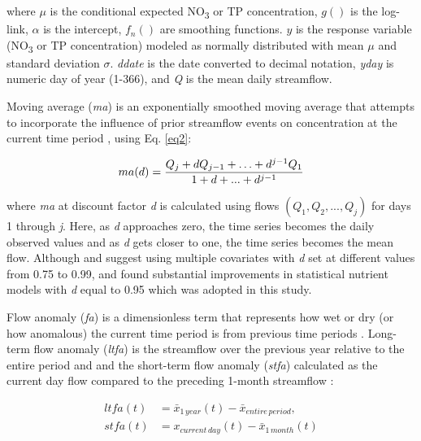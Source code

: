 \documentclass[fleqn,10pt,lineno]{wlpeerj} %
\begin{document}
where \(\mu\) is the conditional expected NO\textsubscript{3} or TP
concentration, \(g()\) is the log-link, \(\alpha\) is the intercept,
\(f_n()\) are smoothing functions. \(y\) is the response variable
(NO\textsubscript{3} or TP concentration) modeled as normally
distributed with mean \(\mu\) and standard deviation \(\sigma\).
\emph{ddate} is the date converted to decimal notation, \emph{yday} is
numeric day of year (1-366), and \emph{Q} is the mean daily streamflow.

Moving average (\emph{ma}) is an exponentially smoothed moving average
that attempts to incorporate the influence of prior streamflow events on
concentration at the current time period
\autocite{wangLoadEstimationUncertainties2011,kuhnertQuantifyingTotalSuspended2012,wangSedimentConcentrationPrediction2013a,zhang_improving_2017},
using Eq. \ref{eq2}:

\begin{equation}
ma(d) = \frac{Q_j + dQ_{j-1} + \mathellipsis + d^{j-1}Q_1}{1+d+...+d^{j-1}}
\label{eq2}
\end{equation}

where \emph{ma} at discount factor \emph{d} is calculated using flows
\((Q_1,Q_2,...,Q_j)\) for days 1 through \emph{j}. Here, as \emph{d}
approaches zero, the time series becomes the daily observed values and
as \emph{d} gets closer to one, the time series becomes the mean flow.
Although \textcite{kuhnertQuantifyingTotalSuspended2012} and
\textcite{wangSedimentConcentrationPrediction2013a} suggest using
multiple covariates with \emph{d} set at different values from 0.75 to
0.99, \textcite{robson_prediction_2015-1} and
\textcite{zhang_improving_2017} found substantial improvements in
statistical nutrient models with \emph{d} equal to 0.95 which was
adopted in this study.

Flow anomaly (\emph{fa}) is a dimensionless term that represents how wet
or dry (or how anomalous) the current time period is from previous time
periods
\autocite{vecchiaTrendsConcentrationsUse2009,zhang_improving_2017}.
Long-term flow anomaly (\emph{ltfa}) is the streamflow over the previous
year relative to the entire period
\autocite[Eq.~\ref{eq3},][]{zhang_improving_2017} and and the short-term
flow anomaly (\emph{stfa}) calculated as the current day flow compared
to the preceding 1-month streamflow
\autocite[Eq.~\ref{eq4},][]{zhang_improving_2017}:

\begin{align}
ltfa(t) &= \bar{x}_{1\,year}(t) - \bar{x}_{entire\,period}, \label{eq3}\\
stfa(t) &= x_{current\,day}(t) - \bar{x}_{1\,month}(t) \label{eq4}
\end{align}
\end{document}
